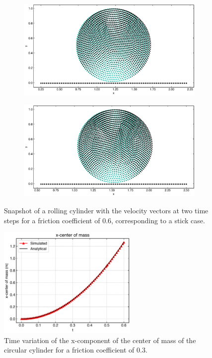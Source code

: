 \begin{figure}[!htpb]
  \centering
  \begin{subfigure}{0.48\textwidth}
    \centering
    \includegraphics[width=1.0\textwidth]{figures/csph/figures/de_2021_cylinder_rolling_on_an_inclined_plane/fric_coeff_0_6/time0}
    \subcaption{}
  \end{subfigure}
  \begin{subfigure}{0.48\textwidth}
    \centering
    \includegraphics[width=1.0\textwidth]{figures/csph/figures/de_2021_cylinder_rolling_on_an_inclined_plane/fric_coeff_0_6/time1}
    \subcaption{}
  \end{subfigure}
  \caption{Snapshot of a rolling cylinder with the velocity vectors at two
    time steps for a friction coefficient of $0.6$, corresponding to a stick
    case.}
\label{fig:de-2021-rolling-mu-0-6}
\end{figure}
%
\begin{figure}[!htpb]
  \centering
  \includegraphics[width=0.6\textwidth]{figures/csph/figures/de_2021_cylinder_rolling_on_an_inclined_plane/fric_coeff_0_3/xcom_vs_time}
  \caption{Time variation of the x-component of the center of mass of the
    circular cylinder for a friction coefficient of $0.3$.}
\label{fig:results-cylinder-rolling-fric-coeff-0-3-xcom-vs-time}
\end{figure}
